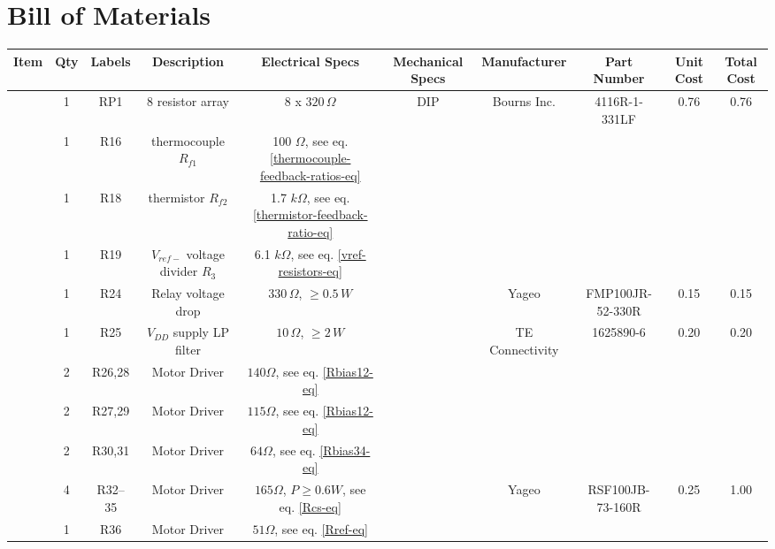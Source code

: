 \documentclass[10pt, twocolumn]{article}
\begin{document}
\pagebreak
\section{Bill of Materials}

\begin{center}
\begin{adjustbox}{max width=\textwidth}
\begin{tabular}{c c c c c c c c c c}
\hline\hline
Item	&Qty	&Labels	&Description		&Electrical Specs		&Mechanical Specs
	&Manufacturer		&Part Number		&Unit Cost	&Total Cost	\\
\hline

	&1	&RP1	&8 resistor array	&8 x $320\,\Omega$		&DIP
	&Bourns Inc.		&4116R-1-331LF		&0.76		&0.76		\\

	&1	&R16	&thermocouple $R_{f1}$	&100 $\Omega$, see eq. \ref{thermocouple-feedback-ratios-eq}	&
	&			&			&		&		\\

	&1	&R18	&thermistor $R_{f2}$	&1.7 $k\Omega$, see eq. \ref{thermistor-feedback-ratio-eq}	&
	&			&			&		&		\\

	&1	&R19	&$V_{ref-}$ voltage divider $R_{3}$	&6.1 $k\Omega$, see eq. \ref{vref-resistors-eq}	&
	&			&			&		&		\\

	&1	&R24	&Relay voltage drop	&$330\,\Omega$, $\geq 0.5\,W$	&
	&Yageo			&FMP100JR-52-330R	&0.15		&0.15		\\

	&1	&R25	&$V_{DD}$ supply LP filter	&$10\,\Omega$, $\geq 2\,W$	&
	&TE Connectivity	&1625890-6		&0.20		&0.20		\\
	
	&2	&R26,28	&Motor Driver	&$140\Omega$, see eq. \ref{Rbias12-eq}	&
	&			&			&		&		\\

	&2	&R27,29	&Motor Driver	&$115\Omega$, see eq. \ref{Rbias12-eq}	&
	&			&			&		&		\\

	&2	&R30,31	&Motor Driver	&$64\Omega$, see eq. \ref{Rbias34-eq}	&
	&			&			&		&		\\

	&4	&R32--35	&Motor Driver	&$165\Omega$, $P\geq 0.6W$, see eq. \ref{Rcs-eq}	&
	&Yageo			&RSF100JB-73-160R	&0.25		&1.00		\\

	&1	&R36	&Motor Driver		&$51\Omega$, see eq. \ref{Rref-eq}
	&			&			&		&		\\


\end{tabular}
\end{adjustbox}
\end{center}
\end{document}

